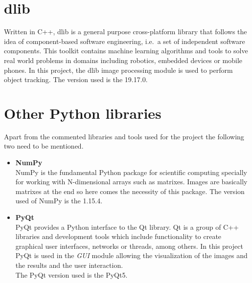 \section{dlib}
Written in C++, dlib is a general purpose cross-platform library that follows the idea of component-based software engineering, i.e.\ a set of independent software components. This toolkit contains machine learning algorithms and tools to solve real world problems in domains including robotics, embedded devices or mobile phones. In this project, the dlib image processing module is used to perform object tracking. The version used is the 19.17.0.
\section{Other Python libraries}
Apart from the commented libraries and tools used for the project the following two need to be mentioned.
\begin{itemize}
\item \textbf{NumPy}\\
NumPy is the fundamental Python package for scientific computing specially for working with N-dimensional arrays such as matrixes. Images are basically matrixes at the end so here comes the necessity of this package. The version used of NumPy is the 1.15.4.
\item \textbf{PyQt}\\
PyQt provides a Python interface to the Qt library. Qt is a group of C++ libraries and development tools which include functionality to create graphical user interfaces, networks or threads, among others. In this project PyQt is used in the \textit{GUI} module allowing the visualization of the images and the results and the user interaction.\\
The PyQt version used is the PyQt5.
\end{itemize}
